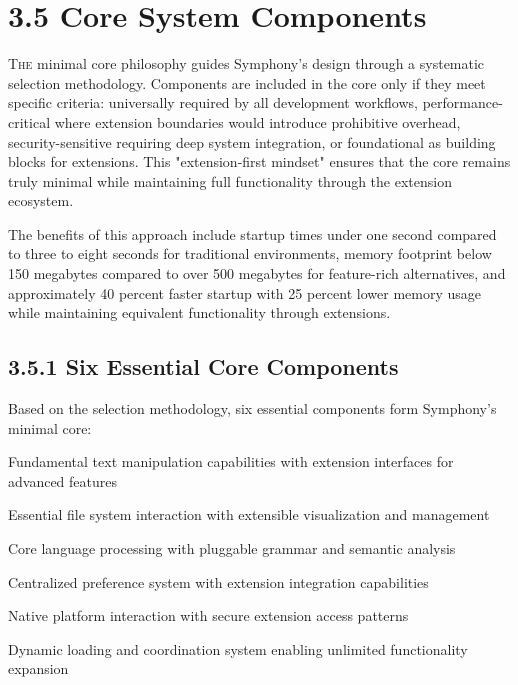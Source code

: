 
\section{3.5 Core System Components}
\label{sec:core-components}

\lettrine{T}{he} minimal core philosophy guides Symphony's design through a systematic selection methodology. Components are included in the core only if they meet specific criteria: universally required by all development workflows, performance-critical where extension boundaries would introduce prohibitive overhead, security-sensitive requiring deep system integration, or foundational as building blocks for extensions. This "extension-first mindset" ensures that the core remains truly minimal while maintaining full functionality through the extension ecosystem.

The benefits of this approach include startup times under one second compared to three to eight seconds for traditional environments, memory footprint below 150 megabytes compared to over 500 megabytes for feature-rich alternatives, and approximately 40 percent faster startup with 25 percent lower memory usage while maintaining equivalent functionality through extensions.


\subsection*{3.5.1 Six Essential Core Components}

Based on the selection methodology, six essential components form Symphony's minimal core:

\begin{description}[leftmargin=4cm,labelwidth=3.5cm]
    \item[\textbf{Text Processing Engine}] Fundamental text manipulation capabilities with extension interfaces for advanced features
    \item[\textbf{Project Navigation}] Essential file system interaction with extensible visualization and management
    \item[\textbf{Syntax Analysis}] Core language processing with pluggable grammar and semantic analysis
    \item[\textbf{Configuration Management}] Centralized preference system with extension integration capabilities
    \item[\textbf{System Integration}] Native platform interaction with secure extension access patterns
    \item[\textbf{Extension Orchestration}] Dynamic loading and coordination system enabling unlimited functionality expansion
\end{description}

